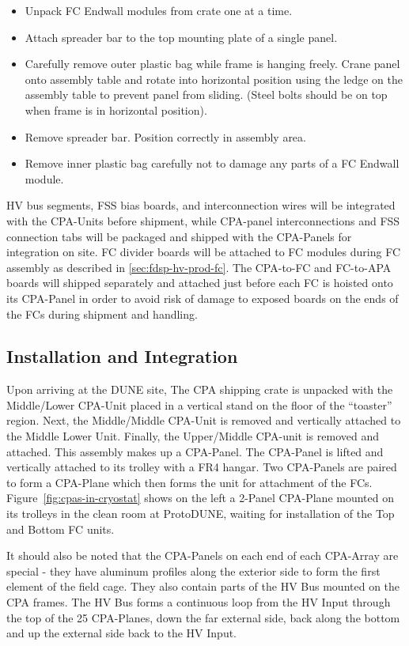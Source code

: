 \begin{itemize}
\item Unpack FC Endwall modules from crate one at a time. 
\item Attach spreader bar to the  top mounting plate of a single panel.
\item Carefully remove outer plastic bag while frame is hanging freely.
Crane panel onto assembly table and rotate into horizontal position using the ledge on the assembly table to prevent panel from sliding. 
(Steel bolts should be on top when frame is in horizontal position).
\item Remove spreader bar. Position correctly in assembly area.
\item Remove inner plastic bag carefully not to damage any parts of a FC Endwall module.
\end{itemize}

HV bus segments, FSS bias boards, and  interconnection wires will be integrated with the CPA-Units before shipment, while CPA-panel interconnections and FSS connection tabs will be packaged and shipped with the CPA-Panels for integration on site.
FC divider boards will be attached to FC modules during FC assembly as described in \ref{sec:fdsp-hv-prod-fc}.
The CPA-to-FC and FC-to-APA boards will shipped separately and attached just before each FC is hoisted onto its CPA-Panel in order to avoid risk of damage to exposed boards on the ends of the FCs during shipment and handling.


\subsection{Installation and Integration}
\label{sec:fdsp-hv-integration}
Upon arriving at the DUNE site, The CPA shipping crate is unpacked with the Middle/Lower CPA-Unit placed in a vertical stand on the floor of the ``toaster'' region.  Next, the Middle/Middle CPA-Unit is removed and vertically attached to the Middle Lower Unit.  Finally, the Upper/Middle CPA-unit is removed and attached.  This assembly makes up a CPA-Panel.  The CPA-Panel is lifted and vertically attached to its trolley with a FR4 hangar.  Two CPA-Panels are paired to form a CPA-Plane which then forms the unit for attachment of the FCs.  Figure~\ref{fig:cpas-in-cryostat} shows on the left a 2-Panel CPA-Plane mounted on its trolleys in the clean room at ProtoDUNE, waiting for installation of the Top and Bottom FC units.

It should also be noted that the CPA-Panels on each end of each CPA-Array are special - they have aluminum profiles along the exterior side to form the first element of the field cage.  They also contain parts of the HV Bus mounted on the CPA frames.  The HV Bus forms a continuous loop from the HV Input through the top of the 25 CPA-Planes, down the far external side, back along the bottom and up the  external side back to the HV Input.

